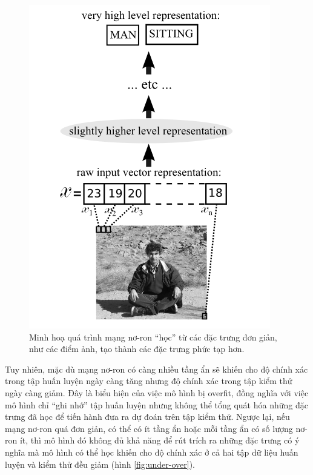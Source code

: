 \begin{figure}[htp]
	\centering
	\includegraphics[width=115 mm]{images/layers-features.png}
	\caption{Minh hoạ quá trình mạng nơ-ron ``học'' từ các đặc trưng đơn giản, như các điểm ảnh, tạo thành các đặc trưng phức tạp hơn.\cite{bengio2009learning}}
	\label{fig:layers-features}
\end{figure}

Tuy nhiên, mặc dù mạng nơ-ron có càng nhiều tầng ẩn sẽ khiến cho độ chính xác trong tập huấn luyện ngày càng tăng nhưng độ chính xác trong tập kiểm thử ngày càng giảm. Đây là biểu hiện của việc mô hình bị overfit, đồng nghĩa với việc mô hình chỉ ``ghi nhớ'' tập huấn luyện nhưng không thể tổng quát hóa những đặc trưng đã học để tiến hành đưa ra dự đoán trên tập kiểm thử. Ngược lại, nếu mạng nơ-ron quá đơn giản, có thể có ít tầng ẩn hoặc mỗi tầng ẩn có số lượng nơ-ron ít, thì mô hình đó không đủ khả năng để rút trích ra những đặc trưng có ý nghĩa mà mô hình có thể học khiến cho độ chính xác ở cả hai tập dữ liệu huấn luyện và kiểm thử đều giảm (hình \ref{fig:under-over}).

